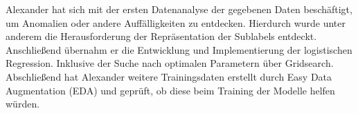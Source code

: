 Alexander hat sich mit der ersten Datenanalyse der gegebenen Daten beschäftigt, um Anomalien oder andere Auffälligkeiten zu entdecken. Hierdurch wurde unter anderem die Herausforderung der Repräsentation der Sublabels entdeckt. Anschließend übernahm er die Entwicklung und Implementierung der logistischen Regression. Inklusive der Suche nach optimalen Parametern über Gridsearch. Abschließend hat Alexander weitere Trainingsdaten erstellt durch Easy Data Augmentation (EDA) und geprüft, ob diese beim Training der Modelle helfen würden. 
